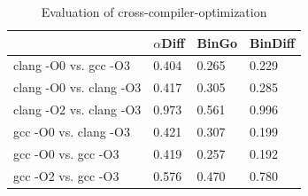 \begin{table}[!t]
\newcommand{\tabincell}[2]{\begin{tabular}{@{}#1@{}}#2\end{tabular}}
\caption{Evaluation of cross-compiler-optimization}
\centering
\begin{tabular}{p{3cm}|p{1.8cm}|p{1.8cm}|p{1.8cm}}  
\hline  
\hline  
  & $\alpha$Diff & BinGo & BinDiff \\
\hline
clang -O0 vs. gcc -O3 & 0.404 & 0.265 & 0.229 \\
clang -O0 vs. clang -O3 & 0.417 & 0.305 & 0.285 \\
clang -O2 vs. clang -O3 & 0.973 & 0.561 & 0.996 \\  
gcc -O0 vs. clang -O3 & 0.421 & 0.307 & 0.199 \\
gcc -O0 vs. gcc -O3 & 0.419 & 0.257 & 0.192 \\
gcc -O2 vs. gcc -O3 & 0.576 & 0.470 & 0.780 \\
\hline  
\hline  
\end{tabular}  
\end{table}

